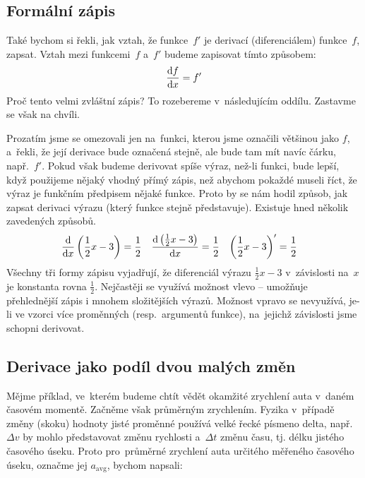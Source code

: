 \subsection{Formální zápis}
\label{subsec:derivace-formalni-zapis}

Také bychom si řekli, jak vztah, že funkce~$f'$ je derivací (diferenciálem)
funkce~$f$, zapsat.
Vztah mezi funkcemi~$f$ a~$f'$ budeme zapisovat tímto způsobem:
\begin{equation*}
    \frac{\mathrm{d} f}{\mathrm{d} x} = f'
\end{equation*}
Proč tento velmi zvláštní zápis? To rozebereme v~následujícím oddílu. Zastavme se
však na chvíli.

Prozatím jsme se omezovali jen na~funkci, kterou jsme označili většinou jako $f$,
a~řekli, že její derivace bude označená stejně, ale bude tam mít navíc čárku,
např.~$f'$. Pokud však budeme derivovat spíše výraz, než-li funkci, bude lepší, když
použijeme nějaký vhodný přímý zápis, než abychom pokaždé museli říct, že výraz je
funkčním předpisem nějaké funkce. Proto by se nám hodil způsob, jak zapsat derivaci
výrazu (který funkce stejně představuje). Existuje hned několik zavedených způsobů.
\begin{align*}
    \frac{\mathrm{d}}{\mathrm{d} x} \left( \frac12 x - 3 \right) &= \frac12 &
    \frac{\mathrm{d} \left( \frac12 x - 3 \right)}{\mathrm{d} x}  &= \frac12 &
    \left( \frac12 x - 3 \right)'               &= \frac12
\end{align*}
Všechny tři formy zápisu vyjadřují, že diferenciál výrazu ${\frac12 x - 3}$
v~závislosti na~$x$ je konstanta rovna $\frac12$. Nejčastěji se využívá možnost vlevo
-- umožňuje přehlednější zápis i mnohem složitějších výrazů. Možnost vpravo se
nevyužívá, je-li ve vzorci více proměnných (resp.\ argumentů funkce), na~jejichž
závislosti jsme schopni derivovat.

\subsection{Derivace jako podíl dvou malých změn}
\label{subsec:derivace-jako-podil}

Mějme příklad, ve~kterém budeme chtít vědět okamžité zrychlení auta v~daném časovém
momentě. Začněme však průměrným zrychlením. Fyzika v~případě změny (skoku) hodnoty
jisté proměnné používá velké řecké písmeno delta, např. $\Delta v$ by mohlo
představovat změnu rychlosti a~$\Delta t$ změnu času, tj. délku jistého časového
úseku. Proto pro~průměrné zrychlení auta určitého měřeného časového úseku, označme
jej $a_{\text{avg}}$,  bychom napsali:

